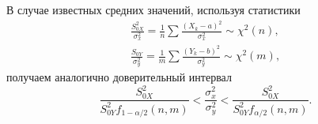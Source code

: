 \begin{ex}
	В случае известных средних значений, используя статистики
\begin{gather*}
  \frac{S_{0X}^2}{\sigma_x^2} = \frac{1}{n}\sum \frac{(X_k-a)^2}{\sigma_x^2}\sim
	\chi^2(n), \\
  \frac{S_{0Y}}{\sigma_y^2} = \frac{1}{m} \sum \frac{(Y_k - b)^2}{\sigma_y^2}
	\sim \chi^2 (m),
\end{gather*}
получаем аналогично доверительный интервал
\[
	\frac{S_{0X}^2}{S_{0Y}^2 f_{1-\alpha/2}(n,m)} < \frac{\sigma_x^2}{\sigma_y^2}
	< \frac{S_{0X}^2}{S_{0Y}^2 f_{\alpha/2}(n,m)}.
\]

\end{ex}
